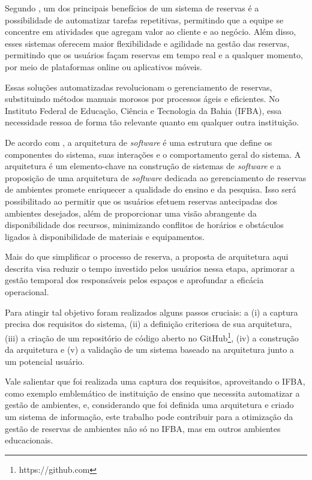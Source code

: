 \documentclass[12pt]{article}
\begin{document}
Segundo \cite{administracao}, um dos principais benefícios de um sistema de reservas é a possibilidade de automatizar tarefas repetitivas, permitindo que a equipe se concentre em atividades que agregam valor ao cliente e ao negócio. Além disso, esses sistemas oferecem maior flexibilidade e agilidade na gestão das reservas, permitindo que os usuários façam reservas em tempo real e a qualquer momento, por meio de plataformas online ou aplicativos móveis.

Essas soluções automatizadas revolucionam o gerenciamento de reservas, substituindo métodos manuais morosos por processos ágeis e eficientes. No Instituto Federal de Educação, Ciência e Tecnologia da Bahia (IFBA), essa necessidade ressoa de forma tão relevante quanto em qualquer outra instituição.

De acordo com \cite{arquitetura}, a arquitetura de \textit{software} é uma estrutura que define os componentes do sistema, suas interações e o comportamento geral do sistema. A arquitetura é um elemento-chave na construção de sistemas de \textit{software} e a proposição de uma arquitetura de \textit{software} dedicada ao gerenciamento de reservas de ambientes promete enriquecer a qualidade do ensino e da pesquisa. Isso será possibilitado ao permitir que os usuários efetuem reservas antecipadas dos ambientes desejados, além de proporcionar uma visão abrangente da disponibilidade dos recursos, minimizando conflitos de horários e obstáculos ligados à disponibilidade de materiais e equipamentos.

Mais do que simplificar o processo de reserva, a proposta de arquitetura aqui descrita visa reduzir o tempo investido pelos usuários nessa etapa, aprimorar a gestão temporal dos responsáveis pelos espaços e aprofundar a eficácia operacional. 

Para atingir tal objetivo foram realizados alguns passos cruciais: a (i) a captura precisa dos requisitos do sistema, (ii) a definição criteriosa de sua arquitetura, (iii) a criação de um repositório de código aberto no GitHub\footnote{https://github.com}, (iv) a construção da arquitetura e (v) a validação de um sistema baseado na arquitetura junto a um potencial usuário. 

 Vale salientar que foi realizada uma captura dos requisitos, aproveitando o IFBA, como exemplo emblemático de instituição de ensino que necessita automatizar a gestão de ambientes, e, considerando que foi definida uma arquitetura e criado um sistema de informação, este trabalho pode contribuir para a otimização da gestão de reservas de ambientes não só no IFBA, mas em outros ambientes educacionais.
\end{document}
